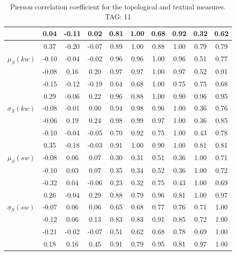 \begin{table*}[h!]
\begin{center}
\begin{tabular}{| l | c | c | c | c | c | c | c | c | c |}
 & 0.04  & -0.11  & 0.02  & 0.81  & 1.00  & 0.68  & 0.92  & 0.32  & 0.62 \\\hline
 & 0.37  & -0.20  & -0.07  & 0.89  & 1.00  & 0.88  & 1.00  & 0.79  & 0.79 \\\hline
$\mu_S(kw)$ & -0.10  & -0.04  & -0.02  & 0.96  & 0.96  & 1.00  & 0.96  & 0.51  & 0.77 \\\hline
 & -0.08  & 0.16  & 0.20  & 0.97  & 0.97  & 1.00  & 0.97  & 0.52  & 0.91 \\\hline
 & -0.15  & -0.12  & -0.19  & 0.64  & 0.68  & 1.00  & 0.75  & 0.75  & 0.68 \\\hline
 & 0.29  & -0.06  & 0.22  & 0.96  & 0.88  & 1.00  & 0.90  & 0.96  & 0.95 \\\hline
$\sigma_S(kw)$ & -0.08  & -0.01  & 0.00  & 0.94  & 0.98  & 0.96  & 1.00  & 0.36  & 0.76 \\\hline
 & -0.06  & 0.19  & 0.24  & 0.98  & 0.99  & 0.97  & 1.00  & 0.36  & 0.85 \\\hline
 & -0.10  & -0.04  & -0.05  & 0.70  & 0.92  & 0.75  & 1.00  & 0.43  & 0.78 \\\hline
 & 0.35  & -0.18  & -0.03  & 0.91  & 1.00  & 0.90  & 1.00  & 0.81  & 0.81 \\\hline
$\mu_S(sw)$ & -0.08  & 0.06  & 0.07  & 0.30  & 0.31  & 0.51  & 0.36  & 1.00  & 0.71 \\\hline
 & -0.10  & 0.03  & 0.07  & 0.35  & 0.34  & 0.52  & 0.36  & 1.00  & 0.72 \\\hline
 & -0.32  & 0.04  & -0.06  & 0.23  & 0.32  & 0.75  & 0.43  & 1.00  & 0.69 \\\hline
 & 0.26  & -0.04  & 0.29  & 0.88  & 0.79  & 0.96  & 0.81  & 1.00  & 0.97 \\\hline
$\sigma_S(sw)$ & -0.07  & 0.06  & 0.06  & 0.65  & 0.68  & 0.77  & 0.76  & 0.71  & 1.00 \\\hline
 & -0.12  & 0.06  & 0.13  & 0.83  & 0.83  & 0.91  & 0.85  & 0.72  & 1.00 \\\hline
 & -0.21  & -0.02  & -0.07  & 0.51  & 0.62  & 0.68  & 0.78  & 0.69  & 1.00 \\\hline
 & 0.18  & 0.16  & 0.45  & 0.91  & 0.79  & 0.95  & 0.81  & 0.97  & 1.00 \\\hline
\end{tabular}
\caption{Pierson correlation coefficient for the topological and textual measures. TAG: 11}
\end{center}
\end{table*}